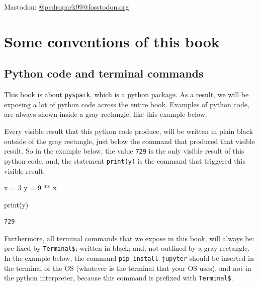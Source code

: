 \documentclass[
  11pt,
  letterpaper,
  DIV=11,
  numbers=noendperiod]{scrreprt}
\newenvironment{Shaded}{\begin{snugshade}}{\end{snugshade}}
\newcommand{\BuiltInTok}[1]{\textcolor[rgb]{0.00,0.23,0.31}{#1}}
\newcommand{\DecValTok}[1]{\textcolor[rgb]{0.68,0.00,0.00}{#1}}
\newcommand{\NormalTok}[1]{\textcolor[rgb]{0.00,0.23,0.31}{#1}}
\newcommand{\OperatorTok}[1]{\textcolor[rgb]{0.37,0.37,0.37}{#1}}
\begin{document}
Mastodon:
\href{https://fosstodon.org/@pedropark99}{@pedropark99@fosstodon.org}

\section*{Some conventions of this
book}\label{some-conventions-of-this-book}


\subsection*{Python code and terminal
commands}\label{python-code-and-terminal-commands}

This book is about \texttt{pyspark}, which is a python package. As a
result, we will be exposing a lot of python code across the entire book.
Examples of python code, are always shown inside a gray rectangle, like
this example below.

Every visible result that this python code produce, will be written in
plain black outside of the gray rectangle, just below the command that
produced that visible result. So in the example below, the value
\texttt{729} is the only visible result of this python code, and, the
statement \texttt{print(y)} is the command that triggered this visible
result.

\begin{Shaded}
\begin{Highlighting}[]
\NormalTok{x }\OperatorTok{=} \DecValTok{3}
\NormalTok{y }\OperatorTok{=} \DecValTok{9} \OperatorTok{**}\NormalTok{ x}

\BuiltInTok{print}\NormalTok{(y)}
\end{Highlighting}
\end{Shaded}

\begin{verbatim}
729
\end{verbatim}

Furthermore, all terminal commands that we expose in this book, will
always be: pre-fixed by \texttt{Terminal\$}; written in black; and, not
outlined by a gray rectangle. In the example below, the command
\texttt{pip\ install\ jupyter} should be inserted in the terminal of the
OS (whatever is the terminal that your OS uses), and not in the python
interpreter, because this command is prefixed with \texttt{Terminal\$}.
\end{document}
